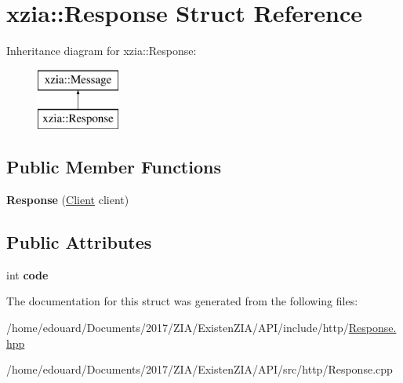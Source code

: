 \hypertarget{structxzia_1_1Response}{}\section{xzia\+:\+:Response Struct Reference}
\label{structxzia_1_1Response}
Inheritance diagram for xzia\+:\+:Response\+:\begin{figure}[H]
\begin{center}
\leavevmode
\includegraphics[height=2.000000cm]{structxzia_1_1Response}
\end{center}
\end{figure}
\subsection*{Public Member Functions}
\begin{DoxyCompactItemize}
\item 
\mbox{\label{structxzia_1_1Response_a05b2024d7e53aaf5c74f0a0f67f85afd}} 
{\bfseries Response} (\mbox{\hyperlink{structClient}{Client}} client)
\end{DoxyCompactItemize}
\subsection*{Public Attributes}
\begin{DoxyCompactItemize}
\item 
\mbox{\label{structxzia_1_1Response_a694b2aca5178bc4569aeffb7e38ef246}} 
int {\bfseries code}
\end{DoxyCompactItemize}


The documentation for this struct was generated from the following files\+:\begin{DoxyCompactItemize}
\item 
/home/edouard/\+Documents/2017/\+Z\+I\+A/\+Existen\+Z\+I\+A/\+A\+P\+I/include/http/\mbox{\hyperlink{Response_8hpp}{Response.\+hpp}}\item 
/home/edouard/\+Documents/2017/\+Z\+I\+A/\+Existen\+Z\+I\+A/\+A\+P\+I/src/http/Response.\+cpp\end{DoxyCompactItemize}
